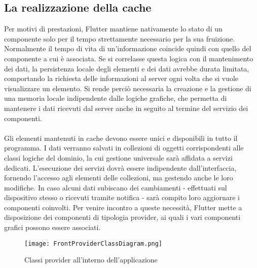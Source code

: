 \subsection{La realizzazione della cache}
Per motivi di prestazioni,
Flutter mantiene nativamente lo stato di un componente 
solo per il tempo strettamente necessario per la sua fruizione. 
Normalmente il tempo di vita di un'informazione coincide quindi 
con quello del componente a cui è associata. 
Se si correlasse questa logica con il mantenimento dei dati,
la persistenza locale degli elementi e dei dati avrebbe durata limitata,
comportando la richiesta delle informazioni al server 
ogni volta che si vuole visualizzare un elemento. 
Si rende perciò necessaria la creazione e la gestione di una memoria locale 
indipendente dalle logiche grafiche,
che permetta di mantenere i dati ricevuti dal server 
anche in seguito al termine del servizio dei componenti.\\
\\
Gli elementi mantenuti in cache devono essere unici e disponibili in tutto il programma.
I dati verranno salvati in collezioni di oggetti corrispondenti alle classi logiche del dominio, 
la cui gestione universale sarà affidata a servizi dedicati. 
L'esecuzione dei servizi dovrà essere indipendente dall'interfaccia,
fornendo l'accesso agli elementi delle collezioni,
ma gestendo anche le loro modifiche.
In caso alcuni dati subiscano dei cambiamenti 
- effettuati sul dispositivo stesso o ricevuti tramite notifica - 
sarà compito loro aggiornare i componenti coinvolti.
Per venire incontro a queste necessità, 
Flutter mette a disposizione dei componenti di tipologia provider,
ai quali i vari componenti grafici possono essere associati.\\
\begin{figure}[h!]
    \centering
    \texttt{[image: FrontProviderClassDiagram.png]}
    \caption{Classi provider all'interno dell'applicazione}
\end{figure}	
\clearpage

